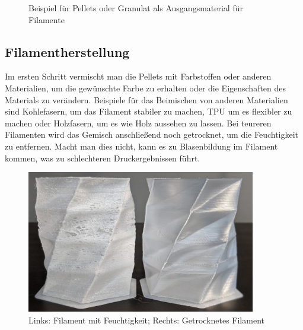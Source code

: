 \documentclass[10pt]{article}
\begin{document}
    \begin{figure}[H]
        \centering
        \qquad
        \caption*{Beispiel für Pellets oder Granulat als Ausgangsmaterial für Filamente}
    \end{figure}

    \subsection{Filamentherstellung}
    Im ersten Schritt vermischt man die Pellets mit Farbstoffen oder anderen Materialien, um die gewünschte Farbe zu erhalten oder die Eigenschaften des Materials zu verändern.
    Beispiele für das Beimischen von anderen Materialien sind Kohlefasern, um das Filament stabiler zu machen, TPU um es flexibler zu machen oder Holzfasern, um es wie Holz aussehen zu lassen.
    Bei teureren Filamenten wird das Gemisch anschließend noch getrocknet, um die Feuchtigkeit zu entfernen.
    Macht man dies nicht, kann es zu Blasenbildung im Filament kommen, was zu schlechteren Druckergebnissen führt.

    \begin{figure}[H]
        \centering
        \includegraphics[width=10cm]{img/wet_filament}
        \caption*{Links: Filament mit Feuchtigkeit; Rechts: Getrocknetes Filament}
    \end{figure}
\end{document}
